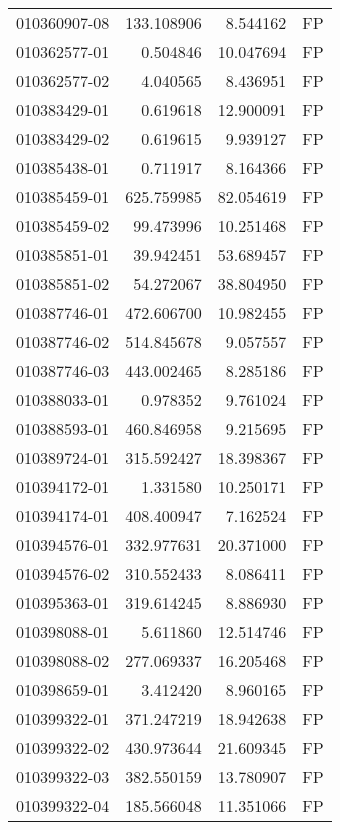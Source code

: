 \begin{tabular}{lrrl}
010360907-08 &  133.108906 &       8.544162 &   FP \\
010362577-01 &    0.504846 &      10.047694 &   FP \\
010362577-02 &    4.040565 &       8.436951 &   FP \\
010383429-01 &    0.619618 &      12.900091 &   FP \\
010383429-02 &    0.619615 &       9.939127 &   FP \\
010385438-01 &    0.711917 &       8.164366 &   FP \\
010385459-01 &  625.759985 &      82.054619 &   FP \\
010385459-02 &   99.473996 &      10.251468 &   FP \\
010385851-01 &   39.942451 &      53.689457 &   FP \\
010385851-02 &   54.272067 &      38.804950 &   FP \\
010387746-01 &  472.606700 &      10.982455 &   FP \\
010387746-02 &  514.845678 &       9.057557 &   FP \\
010387746-03 &  443.002465 &       8.285186 &   FP \\
010388033-01 &    0.978352 &       9.761024 &   FP \\
010388593-01 &  460.846958 &       9.215695 &   FP \\
010389724-01 &  315.592427 &      18.398367 &   FP \\
010394172-01 &    1.331580 &      10.250171 &   FP \\
010394174-01 &  408.400947 &       7.162524 &   FP \\
010394576-01 &  332.977631 &      20.371000 &   FP \\
010394576-02 &  310.552433 &       8.086411 &   FP \\
010395363-01 &  319.614245 &       8.886930 &   FP \\
010398088-01 &    5.611860 &      12.514746 &   FP \\
010398088-02 &  277.069337 &      16.205468 &   FP \\
010398659-01 &    3.412420 &       8.960165 &   FP \\
010399322-01 &  371.247219 &      18.942638 &   FP \\
010399322-02 &  430.973644 &      21.609345 &   FP \\
010399322-03 &  382.550159 &      13.780907 &   FP \\
010399322-04 &  185.566048 &      11.351066 &   FP \\

\end{tabular}
